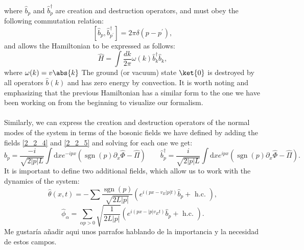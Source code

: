 where $\hat{b}_{p}$ and $\hat{b}^{\dagger}_{p}$ are creation and destruction operators, and must obey the following commutation relation:
\begin{equation} \label{2_2_6}
    [\hat{b}_{p}, \hat{b}^{\dagger}_{p^{\prime}}] = 2\pi \delta (p-p^{\prime}),
\end{equation}
and allows the Hamiltonian to be expressed as follows:
\begin{equation} \label{2_2_7}
    \hat{H} = \int \frac{dk}{2\pi} \omega(k) \hat{b}_{k}^{\dagger} \hat{b}_{k}, 
\end{equation}
where $\omega (k) = v \abs{k}$ The ground (or vacuum) state $\ket{0}$ is destroyed by all operators $\hat{b} (k)$ and has zero energy by convection. It is worth noting and emphasizing that the previous Hamiltonian has a similar form to the one we have been working on from the beginning to visualize our formalism.\\ \\
Similarly, we can express the creation and destruction operators of the normal modes of the system in terms of the bosonic fields we have defined by adding the fields \ref{2_2_4} and \ref{2_2_5} and solving for each one we get:
\begin{equation} \label{2_2_8}
  \hat{b}_{p}  =\frac{-i}{\sqrt{2|p| L}} \int \mathrm{d} x e^{-i p x}\left(\operatorname{sgn}(p) \partial_{x} \hat{\Phi}-\hat{\Pi}\right)  \quad \quad   \hat{b}_{p}^{\dagger}  =\frac{i}{\sqrt{2|p| L}} \int \mathrm{d} x e^{i p x}\left(\operatorname{sgn}(p) \partial_{x} \hat{\Phi}-\hat{\Pi}\right) .
\end{equation}
It is important to define two additional fields, which allow us to work with the dynamics of the system:
\begin{equation} \label{2_2_9}
\hat{\theta}(x, t)=-\sum \frac{\operatorname{sgn}(p)}{\sqrt{2 L|p|}}\left(e^{i\left(p x-v_{E}|p| t\right)} \hat{b}_{p}+\text { h.c. }\right), 
\end{equation}
\begin{equation} \label{2_2_10}
\hat{\phi}_{\alpha}=\sum_{\alpha p>0} \sqrt{\frac{1}{2 L|p|}}\left(e^{i\left(p x-|p| v_{E} t\right)} \hat{b}_{p}+\text { h.c. }\right).
\end{equation}
\textcolor{myred}{Me gustaría añadir aqui unos parrafos hablando de la importancia y la necesidad de estos campos.}
